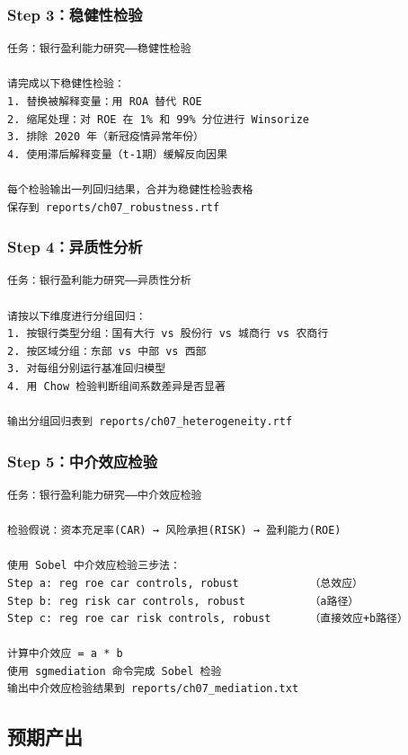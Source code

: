 \subsubsection{Step 3：稳健性检验}

\begin{lstlisting}
任务：银行盈利能力研究——稳健性检验

请完成以下稳健性检验：
1. 替换被解释变量：用 ROA 替代 ROE
2. 缩尾处理：对 ROE 在 1% 和 99% 分位进行 Winsorize
3. 排除 2020 年（新冠疫情异常年份）
4. 使用滞后解释变量（t-1期）缓解反向因果

每个检验输出一列回归结果，合并为稳健性检验表格
保存到 reports/ch07_robustness.rtf
\end{lstlisting}

\subsubsection{Step 4：异质性分析}

\begin{lstlisting}
任务：银行盈利能力研究——异质性分析

请按以下维度进行分组回归：
1. 按银行类型分组：国有大行 vs 股份行 vs 城商行 vs 农商行
2. 按区域分组：东部 vs 中部 vs 西部
3. 对每组分别运行基准回归模型
4. 用 Chow 检验判断组间系数差异是否显著

输出分组回归表到 reports/ch07_heterogeneity.rtf
\end{lstlisting}

\subsubsection{Step 5：中介效应检验}

\begin{lstlisting}
任务：银行盈利能力研究——中介效应检验

检验假说：资本充足率(CAR) → 风险承担(RISK) → 盈利能力(ROE)

使用 Sobel 中介效应检验三步法：
Step a: reg roe car controls, robust           （总效应）
Step b: reg risk car controls, robust          （a路径）
Step c: reg roe car risk controls, robust      （直接效应+b路径）

计算中介效应 = a * b
使用 sgmediation 命令完成 Sobel 检验
输出中介效应检验结果到 reports/ch07_mediation.txt
\end{lstlisting}

\subsection{预期产出}

